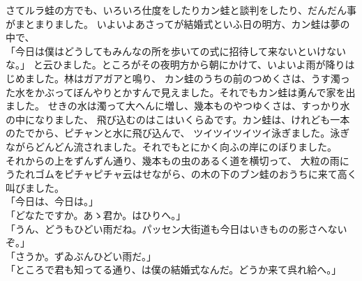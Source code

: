 \documentclass[
a4paper,
10pt,
book]
{tarticle}
\begin{document}
\begin{linenumbers}
    \indent さてルラ蛙の方でも、いろいろ仕度をしたりカン蛙と談判をしたり、だんだん事がまとまりました。
    いよいよあさってが結婚式といふ日の明方、カン蛙は夢の中で、\\
    「今日は僕はどうしてもみんなの所を歩いての式に招待して来ないといけないな。」
    と云ひました。ところがその夜明方から朝にかけて、いよいよ雨が降りはじめました。林はガアガアと鳴り、
    カン蛙のうちの前のつめくさは、うす濁った水をかぶってぼんやりとかすんで見えました。それでもカン蛙は勇んで家を出ました。
    せきの水は濁って大へんに増し、幾本ものやつゆくさは、すっかり水の中になりました、
    飛び込むのはこはいくらゐです。カン蛙は、けれども一本のたでから、ピチャンと水に飛び込んで、
    ツイツイツイツイ泳ぎました。泳ぎながらどんどん流されました。それでもとにかく向ふの岸にのぼりました。\\
    \indent それからの上をずんずん通り、幾本もの虫のあるく道を横切って、
    大粒の雨にうたれゴムをピチャピチャ云はせながら、の木の下のブン蛙のおうちに来て高く叫びました。\\
    「今日は、今日は。」\\
    「どなたですか。あゝ君か。はひりへ。」\\
    「うん、どうもひどい雨だね。パッセン大街道も今日はいきものの影さへないぞ。」\\
    「さうか。ずゐぶんひどい雨だ。」\\
    「ところで君も知ってる通り、は僕の結婚式なんだ。どうか来て呉れ給へ。」
\end{linenumbers}
\end{document}
